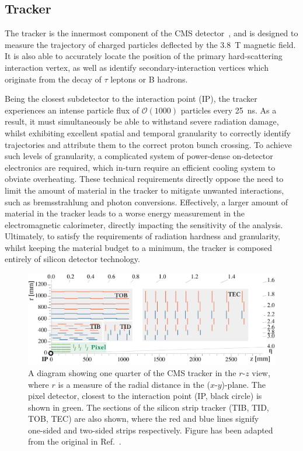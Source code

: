 \subsection{Tracker}\label{sec:cms_tracker}
The tracker is the innermost component of the CMS detector~\cite{Chatrchyan:2008zzk,Chatrchyan:2014fea}, and is designed to measure the trajectory of charged particles deflected by the 3.8~T magnetic field. It is also able to accurately locate the position of the primary hard-scattering interaction vertex, as well as identify secondary-interaction vertices which originate from the decay of $\tau$ leptons or B hadrons. 

Being the closest subdetector to the interaction point (IP), the tracker experiences an intense particle flux of $\mathcal{O}(1000)$ particles every 25~ns. As a result, it must simultaneously be able to withstand severe radiation damage, whilst exhibiting excellent spatial and temporal granularity to correctly identify trajectories and attribute them to the correct proton bunch crossing. To achieve such levels of granularity, a complicated system of power-dense on-detector electronics are required, which in-turn require an efficient cooling system to obviate overheating. These technical requirements directly oppose the need to limit the amount of material in the tracker to mitigate unwanted interactions, such as bremsstrahlung and photon conversions. Effectively, a larger amount of material in the tracker leads to a worse energy measurement in the electromagnetic calorimeter, directly impacting the sensitivity of the \Hgg analysis. Ultimately, to satisfy the requirements of radiation hardness and granularity, whilst keeping the material budget to a minimum, the tracker is composed entirely of silicon detector technology.

\begin{figure}
  \centering
  \includegraphics[width=1\textwidth]{Figures/cms/tracker.pdf}
  \caption[The CMS silicon tracker]
  {
    A diagram showing one quarter of the CMS tracker in the $r$-$z$ view, where $r$ is a measure of the radial distance in the ($x$-$y$)-plane. The pixel detector, closest to the interaction point (IP, black circle) is shown in green. The sections of the silicon strip tracker (TIB, TID, TOB, TEC) are also shown, where the red and blue lines signify one-sided and two-sided strips respectively. Figure has been adapted from the original in Ref.~\cite{CERN-LHCC-2017-009}.
  }
  \label{fig:cms_tracker}
\end{figure}

